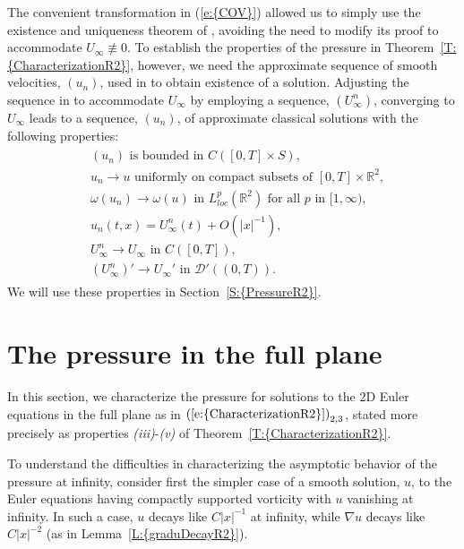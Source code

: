 \documentclass[reqno,openright,11pt,twoside]{amsart}
\theoremstyle{definition}
\numberwithin{equation}{section}
\begin{document}
The convenient transformation in {(\ref{e:{COV}})} allowed us to simply use the existence and uniqueness theorem of \cite{AKLL2014}, avoiding the need to modify its proof to accommodate $U_{\ensuremath{\infty}} \not \equiv 0$. To establish the properties of the pressure in {Theorem~\ref{T:{CharacterizationR2}}}, however, we need the approximate sequence of smooth velocities, $(u_n)$, used in \cite{AKLL2014} to obtain existence of a solution. Adjusting the sequence in \cite{AKLL2014} to accommodate $U_{\ensuremath{\infty}}$ by employing a sequence, $(U^n_{\ensuremath{\infty}})$, converging to $U_{\ensuremath{\infty}}$ leads to a sequence, $(u_n)$, of approximate classical solutions with the following properties:
\begin{align}\label{e:unConvForPressureR2}
	\begin{split}
		&(u_n) \text{ is bounded in } C([0, T] \times S), \\
		&u_n \to u \text{ uniformly on compact subsets of }
		    [0, T] \times {\ensuremath{{\ensuremath{\mathbb{{R}}}}}}^2, \\
		&\omega(u_n) \to \omega(u) \text{ in } L^p_{loc}({\ensuremath{{\ensuremath{\mathbb{{R}}}}}}^2)
			\text{ for all $p$ in } [1, {\ensuremath{\infty}}), \\
		&u_n(t, x) = U^n_{\ensuremath{\infty}}(t) + O({\left\vert{x}\right\vert}^{-1}), \\
		&U_{\ensuremath{\infty}}^n \to U_{\ensuremath{\infty}} \text{ in } C([0, T]), \\
		&(U_{\ensuremath{\infty}}^n)' \to U_{\ensuremath{\infty}}' \text{ in } {\ensuremath{\mathcal{{D}}}}'((0, T)).
	\end{split}
\end{align}
We will use these properties in {Section~\ref{S:{PressureR2}}}.

\section{The pressure in the full plane}\label{S:PressureR2}

\noindent In this section, we characterize the pressure for solutions to the 2D Euler equations in the full plane as in ${(\ref{e:{CharacterizationR2}})}_{2, 3}$, stated more precisely as properties {\textit{({iii})}}-{\textit{({v})}} of {Theorem~\ref{T:{CharacterizationR2}}}.

To understand the difficulties in characterizing the asymptotic behavior of the pressure at infinity, consider first the simpler case of a smooth solution, $u$, to the Euler equations having compactly supported vorticity with $u$ vanishing at infinity. In such a case, $u$ decays like $C {\left\vert{x}\right\vert}^{-1}$ at infinity, while ${\ensuremath{\nabla}} u$ decays like $C {\left\vert{x}\right\vert}^{-2}$ (as in {Lemma~\ref{L:{graduDecayR2}}}).
\end{document}
